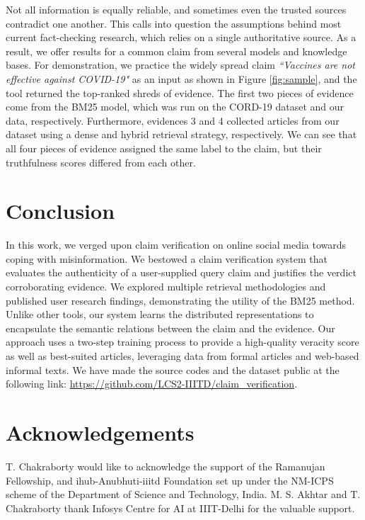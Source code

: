 \documentclass[11pt]{article}
\begin{document}
Not all information is equally reliable, and sometimes even the trusted sources contradict one another. This calls into question the assumptions behind most current fact-checking research, which relies on a single authoritative source. As a result, we offer results for a common claim from several models and knowledge bases. For demonstration, we practice the widely spread claim \textit{``Vaccines are not effective against COVID-19"} as an input as shown in Figure \ref{fig:sample}, and the tool returned the top-ranked shreds of evidence. The first two pieces of evidence come from the BM25 model, which was run on the CORD-19 dataset and our data, respectively. Furthermore, evidences 3 and 4 collected articles from our dataset using a dense and hybrid retrieval strategy, respectively. We can see that all four pieces of evidence assigned the same label to the claim, but their truthfulness scores differed from each other. 





\section{Conclusion}
In this work, we verged upon claim verification on online social media towards coping with misinformation. We bestowed a claim verification system that evaluates the authenticity of a user-supplied query claim and justifies the verdict corroborating evidence. We explored multiple retrieval methodologies and published user research findings, demonstrating the utility of the BM25 method. Unlike other tools, our system learns the distributed representations to encapsulate the semantic relations between the claim and the evidence. Our approach uses a two-step training process to provide a high-quality veracity score as well as best-suited articles, leveraging data from formal articles and web-based informal texts. We have made the source codes and the dataset public at the following link: \url{https://github.com/LCS2-IIITD/claim_verification}.

\section*{Acknowledgements}
T. Chakraborty would like to acknowledge the support of the Ramanujan Fellowship, and ihub-Anubhuti-iiitd Foundation set up under the NM-ICPS scheme of the Department of Science and Technology, India. M. S. Akhtar and T. Chakraborty thank Infosys Centre for AI at IIIT-Delhi for the valuable support.



\end{document}
